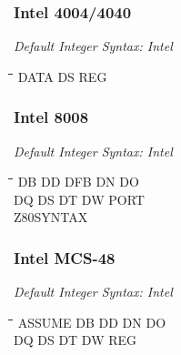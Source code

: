 \subsubsection{Intel 4004/4040}

{\em Default Integer Syntax: Intel}

{\tt\begin{tabbing}
\hspace{3cm}\=\hspace{3cm}\=\hspace{3cm}\=\hspace{3cm}\=\kill   
DATA       \> DS          \> REG \\
\end{tabbing}}

\subsubsection{Intel 8008}

{\em Default Integer Syntax: Intel}

{\tt\begin{tabbing}
\hspace{3cm}\=\hspace{3cm}\=\hspace{3cm}\=\hspace{3cm}\=\kill    
DB         \> DD          \> DFB         \> DN          \> DO \\
DQ         \> DS          \> DT          \> DW          \> PORT \\
Z80SYNTAX \\
\end{tabbing}}

\subsubsection{Intel MCS-48}

{\em Default Integer Syntax: Intel}

{\tt\begin{tabbing}
\hspace{3cm}\=\hspace{3cm}\=\hspace{3cm}\=\hspace{3cm}\=\kill
ASSUME     \> DB         \> DD          \> DN          \> DO \\
DQ         \> DS         \> DT          \> DW          \> REG \\
\end{tabbing}}

